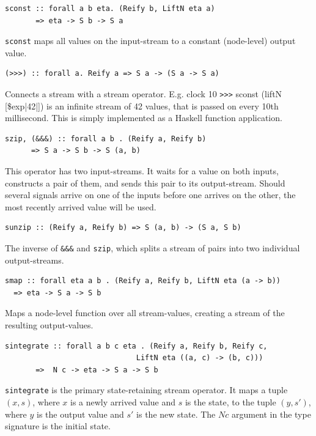 \documentclass[a4paper, oneside, final]{memoir}
\begin{document}
\begin{description}
\item
\begin{verbatim}
sconst :: forall a b eta. (Reify b, LiftN eta a)
       => eta -> S b -> S a
\end{verbatim}
  \texttt{sconst} maps all values on the input-stream to a constant (node-level) output value.

\item
\begin{verbatim}
(>>>) :: forall a. Reify a => S a -> (S a -> S a)
\end{verbatim}
  Connects a stream with a stream operator.  E.g. {\ttfamily clock 10 \verb|>>>|
    sconst (liftN [\$exp|42|])} is an infinite stream of 42 values, that is passed on
  every 10th millisecond. This is simply implemented as a Haskell function
  application.


\item 
\label{item:szip}
\begin{verbatim}
szip, (&&&) :: forall a b . (Reify a, Reify b)
      => S a -> S b -> S (a, b)
\end{verbatim}
  This operator has two input-streams. It waits for a value on both
  inputs, constructs a pair of them, and sends this pair to its
  output-stream.  Should several signals arrive on one of the inputs
  before one arrives on the other, the most recently arrived value
  will be used.

\item 
\begin{verbatim}
sunzip :: (Reify a, Reify b) => S (a, b) -> (S a, S b)
\end{verbatim}
  The inverse of \texttt{\&\&\&} and \texttt{szip}, which splits a
  stream of pairs into two individual output-streams.

\item 
\begin{verbatim}
smap :: forall eta a b . (Reify a, Reify b, LiftN eta (a -> b))
  => eta -> S a -> S b
\end{verbatim}
  Maps a node-level function over all stream-values, creating a stream
  of the resulting output-values.

\item
\begin{verbatim}
sintegrate :: forall a b c eta . (Reify a, Reify b, Reify c,
                              LiftN eta ((a, c) -> (b, c)))
       =>  N c -> eta -> S a -> S b
\end{verbatim}
  \texttt{sintegrate} is the primary state-retaining stream operator.
  It maps a tuple $(x, s)$, where $x$ is a newly arrived
  value and $s$ is the state, to the tuple $(y, s')$, where $y$ is the
  output value and $s'$ is the new state.  The $N c$ argument in the
  type signature is the initial state.


\end{description}
\end{document}
